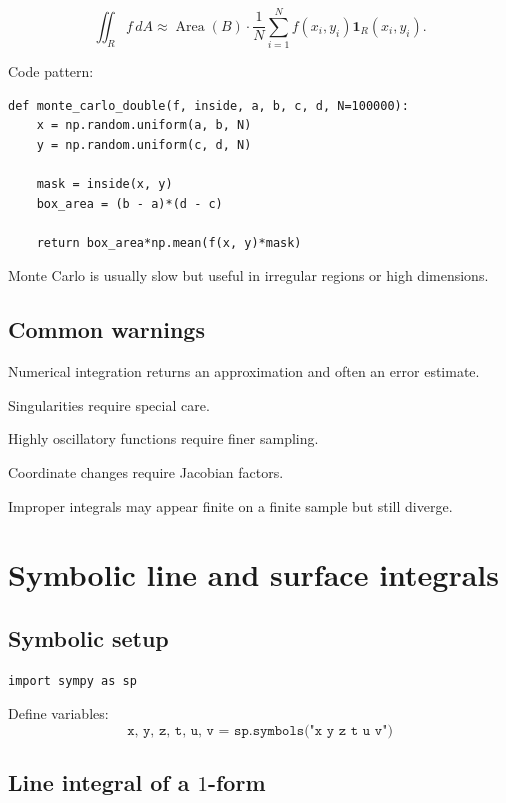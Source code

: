 \[
\boxed{
    \iint_R f\,dA
    \approx
    \operatorname{Area}(B)
    \cdot
    \frac1N
    \sum_{i=1}^N f(x_i,y_i)\mathbf 1_R(x_i,y_i).
}
\]

Code pattern:

\begin{verbatim}
def monte_carlo_double(f, inside, a, b, c, d, N=100000):
    x = np.random.uniform(a, b, N)
    y = np.random.uniform(c, d, N)

    mask = inside(x, y)
    box_area = (b - a)*(d - c)

    return box_area*np.mean(f(x, y)*mask)
\end{verbatim}

Monte Carlo is usually slow but useful in irregular regions or high dimensions.

\subsection*{Common warnings}

Numerical integration returns an approximation and often an error estimate.

Singularities require special care.

Highly oscillatory functions require finer sampling.

Coordinate changes require Jacobian factors.

Improper integrals may appear finite on a finite sample but still diverge.

\section{Symbolic line and surface integrals}
\label{app:G.5}

\subsection*{Symbolic setup}

\begin{verbatim}
import sympy as sp
\end{verbatim}

Define variables:
\[
\boxed{
    \texttt{x, y, z, t, u, v = sp.symbols("x y z t u v")}
}
\]

\subsection*{Line integral of a \texorpdfstring{\(1\)}{1}-form}

